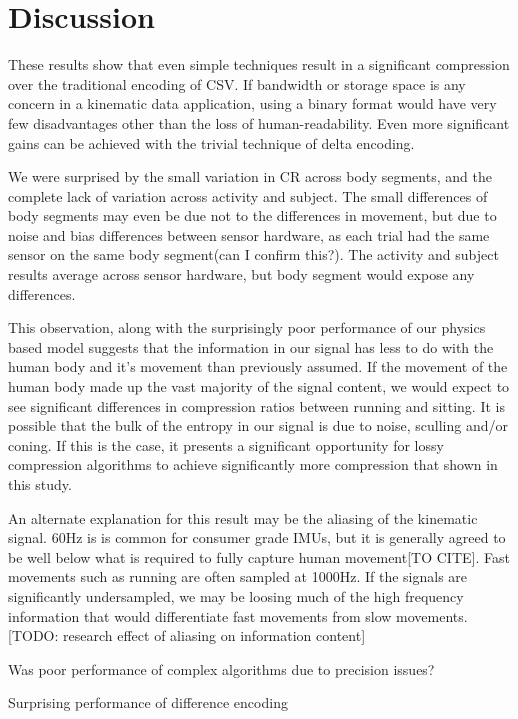 \documentclass[journal]{IEEEtran}
\begin{document}
\section{Discussion}

These results show that even simple techniques result in a significant compression over the traditional encoding of CSV. If bandwidth or storage space is any concern in a kinematic data application, using a binary format would have very few disadvantages other than the loss of human-readability. Even more significant gains can be achieved with the trivial technique of delta encoding.

We were surprised by the small variation in CR across body segments, and the complete lack of variation across activity and subject. The small differences of body segments may even be due not to the differences in movement, but due to noise and bias differences between sensor hardware, as each trial had the same sensor on the same body segment(can I confirm this?). The activity and subject results average across sensor hardware, but body segment would expose any differences.

This observation, along with the surprisingly poor performance of our physics based model suggests that the information in our signal has less to do with the human body and it's movement than previously assumed. If the movement of the human body made up the vast majority of the signal content, we would expect to see significant differences in compression ratios between running and sitting. It is possible that the bulk of the entropy in our signal is due to noise, sculling and/or coning. If this is the case, it presents a significant opportunity for lossy compression algorithms to achieve significantly more compression that shown in this study.

An alternate explanation for this result may be the aliasing of the kinematic signal. 60Hz is is common for consumer grade IMUs, but it is generally agreed to be well below what is required to fully capture human movement[TO CITE]. Fast movements such as running are often sampled at 1000Hz. If the signals are significantly undersampled, we may be loosing much of the high frequency information that would differentiate fast movements from slow movements. [TODO: research effect of aliasing on information content]


Was poor performance of complex algorithms due to precision issues?

Surprising performance of difference encoding
\end{document}
